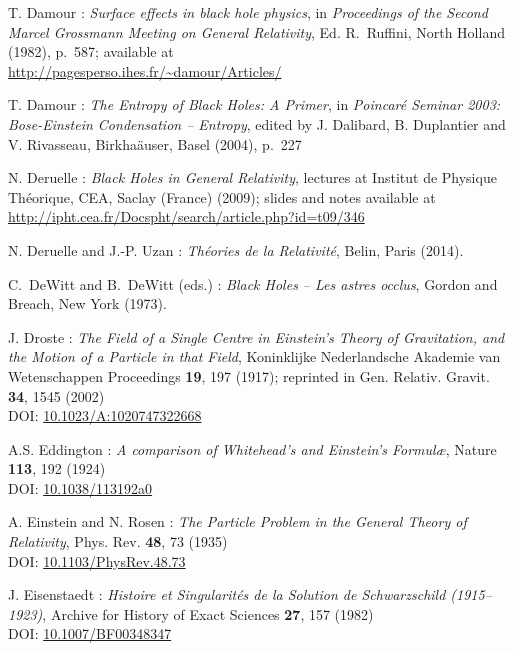 \begin{thebibliography}{123}
T. Damour : {\em Surface effects in black hole physics},
in {\em Proceedings of the Second Marcel Grossmann Meeting on General
Relativity}, Ed. R.~Ruffini, North Holland (1982), p.~587; available at\\
\url{http://pagesperso.ihes.fr/~damour/Articles/}

T. Damour : {\em The Entropy of Black Holes: A Primer},
in {\em Poincaré Seminar 2003: Bose-Einstein Condensation -- Entropy},
edited by J. Dalibard, B. Duplantier and V. Rivasseau, Birkha\"auser, Basel (2004),
p.~227

N. Deruelle : {\em Black Holes in General Relativity}, lectures at
Institut de Physique Théorique, CEA, Saclay (France) (2009); slides and notes
available at \\
\url{http://ipht.cea.fr/Docspht/search/article.php?id=t09/346}

N. Deruelle and J.-P. Uzan : {\em Th\'eories de la Relativit\'e},
Belin, Paris (2014).

C.~DeWitt and B.~DeWitt (eds.) :
{\em Black Holes -- Les astres occlus},
Gordon and Breach, New York (1973).

J. Droste :
{\em The Field of a Single Centre in Einstein's Theory of Gravitation, and the Motion of a Particle in that Field},
Koninklijke Nederlandsche Akademie van Wetenschappen Proceedings {\bf 19}, 197 (1917);
reprinted in Gen. Relativ. Gravit. {\bf 34}, 1545 (2002)\\
DOI: \href{http://dx.doi.org/10.1023/A:1020747322668}{10.1023/A:1020747322668}

A.S. Eddington : {\em A comparison of Whitehead's and Einstein's Formul\ae},
Nature {\bf 113}, 192 (1924) \\
DOI: \href{http://dx.doi.org/10.1038/113192a0}{10.1038/113192a0}

A. Einstein and N. Rosen :
{\em The Particle Problem in the General Theory of Relativity},
Phys. Rev. {\bf 48}, 73 (1935) \\
DOI: \href{https://doi.org/10.1103/PhysRev.48.73}{10.1103/PhysRev.48.73}

J. Eisenstaedt :
{\em Histoire et Singularit\'es de la Solution de Schwarzschild (1915–1923)},
Archive for History of Exact Sciences {\bf 27}, 157 (1982) \\
DOI: \href{http://dx.doi.org/10.1007/BF00348347}{10.1007/BF00348347}


\end{thebibliography}
